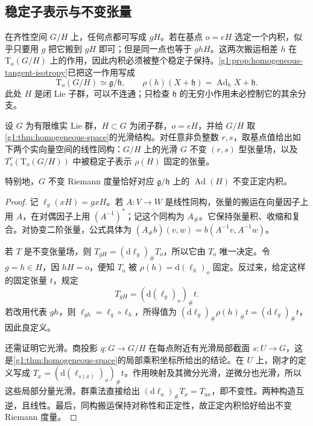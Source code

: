 \subsection{稳定子表示与不变张量}
\label{g1:subsec:1703:03}

在齐性空间 \(G/H\) 上，任何点都可写成 \(gH\)。若在基点 \(o=eH\) 选定一个内积，似乎只要用 \(g\) 把它搬到 \(gH\) 即可；但是同一点也等于 \(ghH\)。这两次搬运相差 \(h\) 在 \(\mathrm{T}_o(G/H)\) 上的作用，因此内积必须被整个稳定子保持。\cref{g1:prop:homogeneous-tangent-isotropy}已把这一作用写成
\[
	\mathrm{T}_o(G/H)\simeq\mathfrak g/\mathfrak h,\qquad
	\rho(h)(X+\mathfrak h)=\operatorname{Ad}_hX+\mathfrak h.
\]
此处 \(H\) 是闭 Lie 子群，可以不连通；只检查 \(\mathfrak h\) 的无穷小作用未必控制它的其余分支。

\begin{proposition}\label{g1:prop:invariant-tensor-isotropy}
	设 \(G\) 为有限维实 Lie 群，\(H\subset G\) 为闭子群，\(o=eH\)，并给 \(G/H\) 取\cref{g1:thm:homogeneous-space}的光滑结构。对任意非负整数 \(r,s\)，取基点值给出如下两个实向量空间的线性同构：\(G/H\) 上的光滑 \(G\) 不变 \((r,s)\) 型张量场，以及 \(T^r_s(\mathrm{T}_o(G/H))\) 中被稳定子表示 \(\rho(H)\) 固定的张量。

	特别地，\(G\) 不变 Riemann 度量恰好对应 \(\mathfrak g/\mathfrak h\) 上的 \(\operatorname{Ad}(H)\) 不变正定内积。
\end{proposition}
\begin{proof}
	记 \(\ell_g(xH)=gxH\)。若 \(A:V\to W\) 是线性同构，张量的搬运在向量因子上用 \(A\)，在对偶因子上用 \((A^{-1})^*\)；记这个同构为 \(A_\#\)。它保持张量积、收缩和复合。对协变二阶张量，公式具体为 \((A_\#b)(v,w)=b(A^{-1}v,A^{-1}w)\)。

	若 \(T\) 是不变张量场，则 \(T_{gH}=(\mathrm{d}\ell_g)_\#T_o\)，所以它由 \(T_o\) 唯一决定。令 \(g=h\in H\)，因 \(hH=o\)，便知 \(T_o\) 被 \(\rho(h)=\mathrm{d}(\ell_h)_o\) 固定。反过来，给定这样的固定张量 \(t\)，规定
	\[
		T_{gH}=(\mathrm{d}(\ell_g)_o)_\#t.
	\]
	若改用代表 \(gh\)，则 \(\ell_{gh}=\ell_g\circ\ell_h\)，所得值为 \((\mathrm{d}\ell_g)_\#\rho(h)_\#t=(\mathrm{d}\ell_g)_\#t\)，因此良定义。

	还需证明它光滑。商投影 \(q:G\to G/H\) 在每点附近有光滑局部截面 \(s:U\to G\)，这是\cref{g1:thm:homogeneous-space}的局部乘积坐标所给出的结论。在 \(U\) 上，刚才的定义写成 \(T_x=(\mathrm{d}(\ell_{s(x)})_o)_\#t\)。作用映射及其微分光滑，逆微分也光滑，所以这些局部分量光滑。群乘法直接给出 \((\mathrm{d}\ell_a)_\#T_x=T_{ax}\)，即不变性。两种构造互逆，且线性。最后，同构搬运保持对称性和正定性，故正定内积恰好给出不变 Riemann 度量。
\end{proof}

